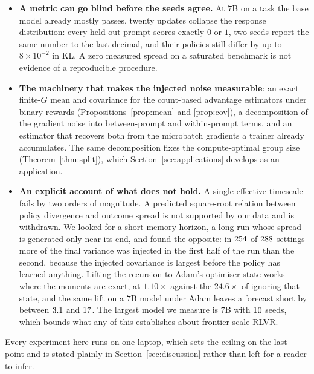 \begin{itemize}
  \item \textbf{A metric can go blind before the seeds agree.} At $7$B on a task the base model
  already mostly passes, twenty updates collapse the response distribution: every held-out prompt
  scores exactly $0$ or $1$, two seeds report the same number to the last decimal, and their
  policies still differ by up to $8\times10^{-2}$ in KL. A zero measured spread on a saturated
  benchmark is not evidence of a reproducible procedure.

  \item \textbf{The machinery that makes the injected noise measurable}: an exact finite-$G$ mean
  and covariance for the count-based advantage estimators under binary rewards
  (Propositions~\ref{prop:mean} and \ref{prop:cov}), a decomposition of the gradient noise into
  between-prompt and within-prompt terms, and an estimator that recovers both from the microbatch
  gradients a trainer already accumulates. The same decomposition fixes the compute-optimal group
  size (Theorem~\ref{thm:split}), which Section~\ref{sec:applications} develops as an application.

  \item \textbf{An explicit account of what does not hold.} A single effective timescale fails by
  two orders of magnitude. A predicted square-root relation between policy divergence and outcome
  spread is not supported by our data and is withdrawn. We looked for a short memory horizon, a
  long run whose spread is generated only near its end, and found the opposite: in
  $254$ of $288$ settings more of the final variance was injected in the
  first half of the run than the second, because the injected covariance is largest before the
  policy has learned anything. Lifting the recursion to Adam's optimiser state works where the
  moments are exact, at $1.10\times$ against the $24.6\times$ of ignoring that state, and the same
  lift on a $7$B model under Adam leaves a forecast short by between $3.1$
  and $17$. The largest model we measure is $7$B with $10$ seeds, which
  bounds what any of this establishes about frontier-scale RLVR.

\end{itemize}

Every experiment here runs on one laptop, which sets the ceiling on the last point and is stated
plainly in Section~\ref{sec:discussion} rather than left for a reader to infer.
